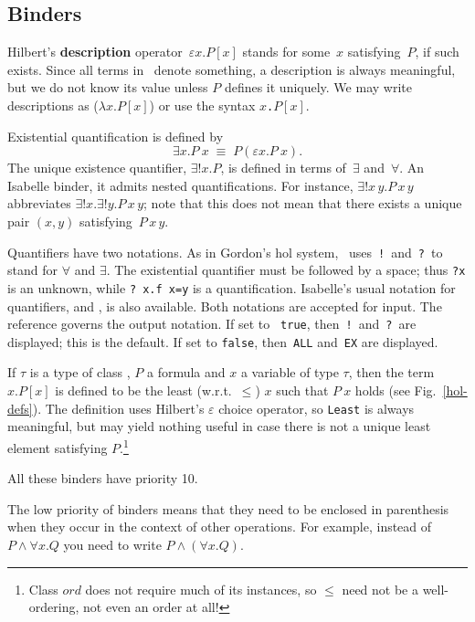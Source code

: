 \subsection{Binders}

Hilbert's {\bf description} operator~$\varepsilon x.P[x]$ stands for
some~$x$ satisfying~$P$, if such exists.  Since all terms in \HOL\ 
denote something, a description is always meaningful, but we do not
know its value unless $P$ defines it uniquely.  We may write
descriptions as ($\lambda x.P[x]$) or use the syntax
\hbox{\tt \at $x$.$P[x]$}.

Existential quantification is defined by
\[ \exists x.P~x \;\equiv\; P(\varepsilon x.P~x). \]
The unique existence quantifier, $\exists!x.P$, is defined in terms
of~$\exists$ and~$\forall$.  An Isabelle binder, it admits nested
quantifications.  For instance, $\exists!x\,y.P\,x\,y$ abbreviates
$\exists!x. \exists!y.P\,x\,y$; note that this does not mean that there
exists a unique pair $(x,y)$ satisfying~$P\,x\,y$.

Quantifiers have two notations.  As in Gordon's {\sc hol} system, \HOL\
uses~{\tt!}\ and~{\tt?}\ to stand for $\forall$ and $\exists$.  The
existential quantifier must be followed by a space; thus {\tt?x} is an
unknown, while \verb'? x.f x=y' is a quantification.  Isabelle's usual
notation for quantifiers, \sdx{ALL} and \sdx{EX}, is also
available.  Both notations are accepted for input.  The {\ML} reference
\ttindexbold{HOL_quantifiers} governs the output notation.  If set to {\tt
true}, then~{\tt!}\ and~{\tt?}\ are displayed; this is the default.  If set
to \texttt{false}, then~{\tt ALL} and~{\tt EX} are displayed.

If $\tau$ is a type of class , $P$ a formula and $x$ a
variable of type $\tau$, then the term ~$x.P[x]$ is defined
to be the least (w.r.t.\ $\le$) $x$ such that $P~x$ holds (see
Fig.~\ref{hol-defs}).  The definition uses Hilbert's $\varepsilon$
choice operator, so \texttt{Least} is always meaningful, but may yield
nothing useful in case there is not a unique least element satisfying
$P$.\footnote{Class $ord$ does not require much of its instances, so
  $\le$ need not be a well-ordering, not even an order at all!}

\medskip All these binders have priority 10.

\begin{warn}
The low priority of binders means that they need to be enclosed in
parenthesis when they occur in the context of other operations.  For example,
instead of $P \land \forall x.Q$ you need to write $P \land (\forall x.Q)$.
\end{warn}


